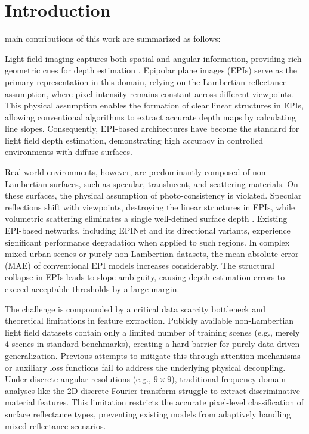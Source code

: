 \documentclass[lettersize,journal]{IEEEtran}
\begin{document}
\section{Introduction}

 main contributions of this work are summarized as follows:

Light field imaging captures both spatial and angular information, providing rich geometric cues for depth estimation \cite{he2016}. Epipolar plane images (EPIs) serve as the primary representation in this domain, relying on the Lambertian reflectance assumption, where pixel intensity remains constant across different viewpoints. This physical assumption enables the formation of clear linear structures in EPIs, allowing conventional algorithms to extract accurate depth maps by calculating line slopes. Consequently, EPI-based architectures have become the standard for light field depth estimation, demonstrating high accuracy in controlled environments with diffuse surfaces.

Real-world environments, however, are predominantly composed of non-Lambertian surfaces, such as specular, translucent, and scattering materials. On these surfaces, the physical assumption of photo-consistency is violated. Specular reflections shift with viewpoints, destroying the linear structures in EPIs, while volumetric scattering eliminates a single well-defined surface depth . Existing EPI-based networks, including EPINet and its directional variants, experience significant performance degradation when applied to such regions. In complex mixed urban scenes or purely non-Lambertian datasets, the mean absolute error (MAE) of conventional EPI models increases considerably. The structural collapse in EPIs leads to slope ambiguity, causing depth estimation errors to exceed acceptable thresholds by a large margin.

The challenge is compounded by a critical data scarcity bottleneck and theoretical limitations in feature extraction. Publicly available non-Lambertian light field datasets contain only a limited number of training scenes (e.g., merely 4 scenes in standard benchmarks), creating a hard barrier for purely data-driven generalization. Previous attempts to mitigate this through attention mechanisms or auxiliary loss functions fail to address the underlying physical decoupling. Under discrete angular resolutions (e.g., $9 \times 9$), traditional frequency-domain analyses like the 2D discrete Fourier transform struggle to extract discriminative material features. This limitation restricts the accurate pixel-level classification of surface reflectance types, preventing existing models from adaptively handling mixed reflectance scenarios.
\end{document}
